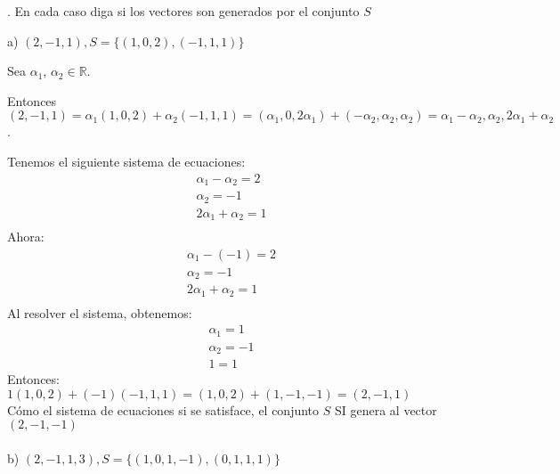 \documentclass[letterpaper]{article}
\renewcommand{\*}{\cdot}
\theoremstyle{definition}
\begin{document}
. En cada caso diga si los vectores son generados por el conjunto $S$


a) $(2,-1,1), S =  \lbrace (1,0,2),(-1,1,1) \rbrace$

Sea $\alpha _1$, $\alpha _2 \in \mathbb{R}$.

Entonces $(2,-1,1) = \alpha _{1}(1,0,2) + \alpha _{2}(-1,1,1) = (\alpha _{1}, 0, 2\alpha _{1})+ (-\alpha _{2},\alpha _{2},\alpha _{2}) = \alpha _{1}-\alpha _{2},\alpha _{2},2\alpha _{1}+\alpha _{2}$.

Tenemos el siguiente sistema de ecuaciones:
\begin{eqnarray*}
\alpha_{1}-\alpha_{2}= 2 \\
\alpha_{2} = -1\\
2\alpha_{1}+\alpha_{2}=1\\
\end{eqnarray*}
Ahora:
\begin{eqnarray*}
\alpha_{1} -(-1)=2 \\
\alpha_{2}=-1\\
2\alpha_{1} + \alpha_{2} = 1\\
\end{eqnarray*}
Al resolver el sistema, obtenemos:
\begin{eqnarray*}
\alpha_{1}=1 \\
\alpha_{2} = -1 \\
1 = 1
\end{eqnarray*}
Entonces:\\ $1(1,0,2) + (-1)(-1,1,1) = (1,0,2) + (1,-1,-1) = (2,-1,1)$\\
Cómo el sistema de ecuaciones si se satisface, el conjunto $S$ SI genera al vector $(2,-1,-1)$\\ \\

\noindent b) $(2,-1,1,3), S =  \lbrace (1,0,1,-1),(0,1,1,1) \rbrace$
\end{document}
